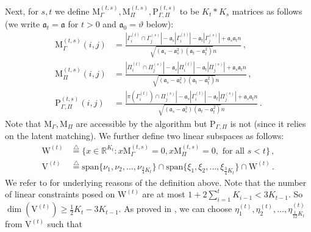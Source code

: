 \documentclass[11pt]{article}
\numberwithin{equation}{section}
\begin{document}
Next, for $s, t$ we define
$\mathrm{M}_{\Gamma}^{(t,s)},\mathrm{M}_{\Pi}^{(t,s)},\mathrm{P}_{\Gamma,\Pi}^{(t,s)}$ to be $K_t*K_s$ matrices as follows (we write $\mathfrak{a}_t= \mathfrak{a}$ for $t>0$ and $\mathfrak{a}_0= \vartheta$ below): 
\begin{equation}
    \begin{aligned}
        \mathrm{M}_{\Gamma}^{(t,s)}(i,j) & = \frac{  |\Gamma^{(t)}_i \cap \Gamma^{(s)}_j | - \mathfrak{a}_s |\Gamma^{(t)}_i | - \mathfrak{a}_t |\Gamma^{(s)}_j | + \mathfrak{a}_s \mathfrak{a}_t n }{ \sqrt{(\mathfrak{a}_s-\mathfrak{a}_s^2) (\mathfrak{a}_t-\mathfrak{a}_t^2)} n} \,,\\
        \mathrm{M}_{\Pi}^{(t,s)} (i,j)  & = \frac{ |\Pi^{(t)}_i \cap \Pi^{(s)}_j| - \mathfrak{a}_s |\Pi^{(t)}_i| - \mathfrak{a}_t |\Pi^{(s)}_j| + \mathfrak{a}_s \mathfrak{a}_t n} { \sqrt{(\mathfrak{a}_s-\mathfrak{a}_s^2) (\mathfrak{a}_t-\mathfrak{a}_t^2)} n} \,, \\
        \mathrm{P}_{\Gamma,\Pi}^{(t,s)}(i,j) & = \frac{ |\pi(\Gamma^{(t)}_i) \cap \Pi^{(s)}_j| - \mathfrak{a}_s |\Gamma^{(t)}_i| - \mathfrak{a}_t |\Pi^{(s)}_j| + \mathfrak{a}_s \mathfrak{a}_t n }{ \sqrt{(\mathfrak{a}_s-\mathfrak{a}_s^2) (\mathfrak{a}_t-\mathfrak{a}_t^2)} n} \,.
        \label{equ_martix_M_P}
    \end{aligned}
\end{equation}
Note that $\mathrm{M}_{\Gamma},\mathrm{M}_{\Pi}$ are accessible by the algorithm but $\mathrm{P}_{\Gamma,\Pi}$ is not (since it relies on the latent matching). We further define two linear subspaces as follows:
\begin{equation}
    \begin{aligned}
        \mathrm{W}^{(t)} & \overset{\triangle}{=}  \big \{ x \in \mathbb{R}^{K_t} :
        x \mathrm{M}_{\Gamma}^{(t,s)} = 0, 
        x \mathrm{M}_{\Pi}^{(t,s)} = 0,  \mbox{ for all } s<t \big\} \,, \\
        \mathrm{V}^{(t)} & \overset{\triangle}{=}  \mathrm{span} \big\{ \nu_1,\nu_2,\ldots,\nu_{\frac{3}{4}K_t} \big\}  \cap \mathrm{span} \big\{  \xi_1,\xi_2,\ldots,\xi_{\frac{3}{4}K_t}  \big\} \cap \mathrm{W}^{(t)} \,.
        \label{equ-linear-space}
    \end{aligned}
\end{equation}
We refer to \cite[Remark 3.3]{DL22+} for underlying reasons of the definition above. Note that the number of linear constraints posed on $\mathrm{W}^{(t)}$ are at most $1+ 2\sum_{i=1}^{t}K_{i-1} < 3K_{t-1}$. So $\dim ( \mathrm{V}^{(t)}) \geq \frac{1}{2}K_t - 3K_{t-1}$. As proved in \cite[(2.10) and (2.11)]{DL22+}, we can choose $\eta^{(t)}_1,\eta^{(t)}_2,\ldots,\eta^{(t)}_{\frac{1}{12}K_t}$ from $\mathrm{V}^{(t)}$ such that
\end{document}

